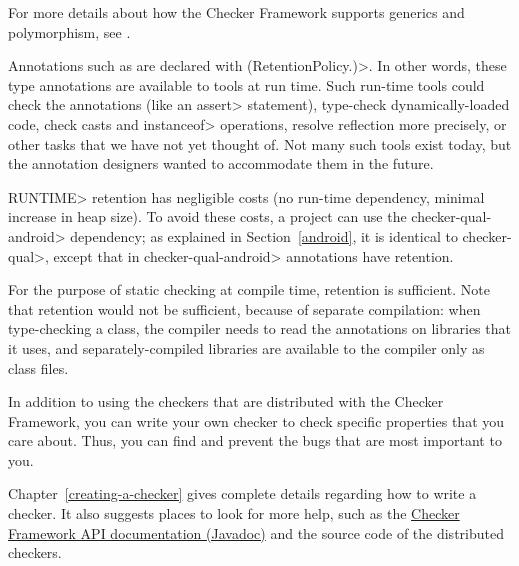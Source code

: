For more details about how the Checker Framework supports generics and
polymorphism, see .



Annotations such as  are
declared with
\<(RetentionPolicy.)>.  In other words,
these type annotations are available to tools at run time.  Such run-time
tools could check the annotations (like an \<assert> statement), type-check
dynamically-loaded code, check casts and \<instanceof> operations, resolve
reflection more precisely, or other tasks that we have not yet thought of.
Not many such tools exist today, but the annotation designers wanted to
accommodate them in the future.

\<RUNTIME> retention has negligible costs (no run-time dependency, minimal
increase in heap size). To avoid these costs, a project can use the
\<checker-qual-android> dependency; as explained in Section~\ref{android},
it is identical to \<checker-qual>, except that in \<checker-qual-android>
annotations have
retention.

For the purpose of static checking at compile time,
retention is sufficient.  Note that
retention would not be sufficient, because of separate compilation: when
type-checking a class, the compiler needs to read the annotations on
libraries that it uses, and separately-compiled libraries are available to
the compiler only as class files.




In addition to using the checkers that are distributed with the Checker
Framework, you can write your own checker to check specific properties that
you care about.  Thus, you can find and prevent the bugs that are most
important to you.

Chapter~\ref{creating-a-checker} gives
complete details regarding how to write a checker.  It also suggests places
to look for more help, such as the \href{../api/}{Checker Framework
API documentation (Javadoc)} and the source code of the distributed
checkers.

